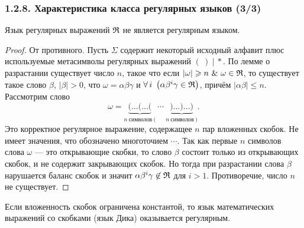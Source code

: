 \documentclass[mathserif,12pt,aspectratio=169]{beamer}
\def\A#1#2{\forall\,#1\ \left(#2\right)}
\def\And{\operatorname{\,\&\,}}
\let\le\leqslant
\let\ge\geqslant
\begin{document}
\begin{frame}
\frametitle{1.2.8. Характеристика класса регулярных языков (3/3) }

\begin{theorem}
Язык регулярных выражений $\frak{R}$ не является регулярным языком.
\end{theorem}
\begin{proof}
От противного.
Пусть $\Sigma$  
содержит некоторый исходный алфавит 
плюс используемые метасимволы регулярных выражений $(~)~|~*$. По лемме о разрастании существует число $n$,
такое что если $|\omega|\ge n \And \omega\in \frak{R}$, то существует
такое слово $\beta$, $|\beta|>0$, что $\omega=\alpha\beta\gamma$
и $\A{i}{\alpha\beta^i\gamma\in\frak{R}}$, причём $|\alpha\beta|\le n$.
Рассмотрим слово
\[
\omega=\underbrace{( \dots ( \dots (}_{n~\text{символов}~(}\ \cdots\ 
\underbrace{)\dots )\dots)}_{n~\text{символов}~)}.
\]
Это корректное регулярное выражение, содержащее $n$ пар вложенных скобок.
Не имеет значения, что обозначено многоточием $\cdots$. 
Так как первые $n$ символов слова $\omega$ --- это открывающие скобки,
то слово $\beta$ состоит только из открывающих скобок, 
и не содержит закрывающих скобок. 
Но тогда при разрастании слова $\beta$ нарушается баланс скобок и значит
  $\alpha\beta^i\gamma\not\in\frak{R}$ для $i>1$.
  Противоречие, число $n$ не существует. 
\end{proof}

\begin{remark}
Если вложенность скобок ограничена константой, то язык математических выражений
со скобками (язык Дика) оказывается регулярным.
\end{remark}

\end{frame}




\end{document}
